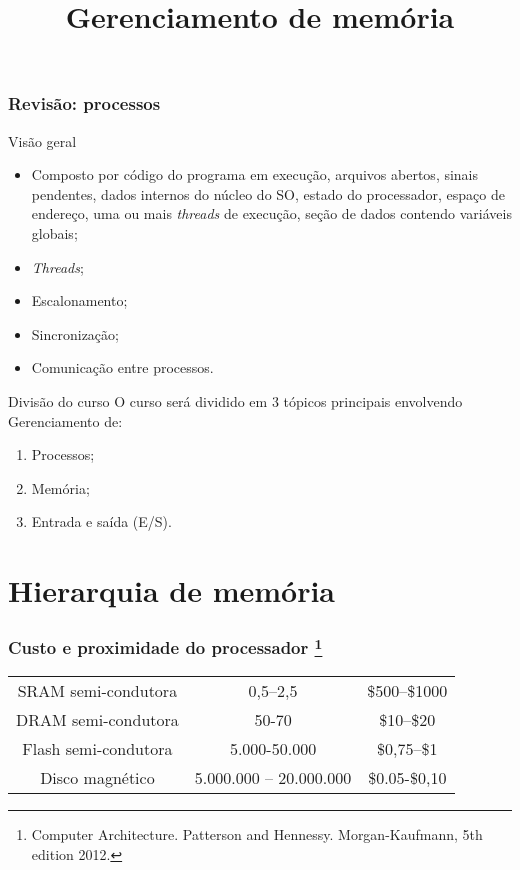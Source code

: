 
\title{Gerenciamento de memória}

\frame{\titlepage}

\begin{frame}
\frametitle{Revis\~ao: processos}

 \begin{block}{Visão geral}
        \begin{itemize}
        \item Composto por código do programa em execução, arquivos
          abertos, sinais pendentes, dados internos do núcleo do SO,
          estado do processador, espaço de endereço, uma ou mais {\em
            threads} de execução, seção de dados contendo variáveis globais;
            \item \textit{Threads};
          \item Escalonamento;
          \item Sincronização;
          \item Comunicação entre processos.
           
        \end{itemize}
      \end{block}

\end{frame}

\begin{frame}{Divisão do curso}
  \footnotesize
  O curso será dividido em $3$ tópicos principais envolvendo
  Gerenciamento de:
  \begin{enumerate}
  \item Processos;
  \item {\large\alert{Memória}};
  \item Entrada e saída (E/S).
  \end{enumerate}
\end{frame}

\section{Hierarquia de memória}

\def\headcolor{blue!80!black}

\begin{frame}
\frametitle{Custo e proximidade do processador
\footnote{\scriptsize Computer Architecture. 
Patterson and Hennessy. Morgan-Kaufmann, 5th edition 2012.}}
\small  
  \begin{tabular}[h]{c|c|c} \hline
    \color{\headcolor}{Tecnologia} &  \color{\headcolor}{Tempo de acesso (ns)} &  \color{\headcolor}{US\$ por GB (2012)}\\ \hline
    SRAM semi-condutora & 0,5--2,5 & \$500--\$1000\\
    DRAM semi-condutora& 50-70 & \$10--\$20\\
    Flash semi-condutora& 5.000-50.000 & \$0,75--\$1\\
    Disco magnético & 5.000.000 -- 20.000.000 & \$0.05-\$0,10\\ \hline
  \end{tabular}
  
\end{frame}

